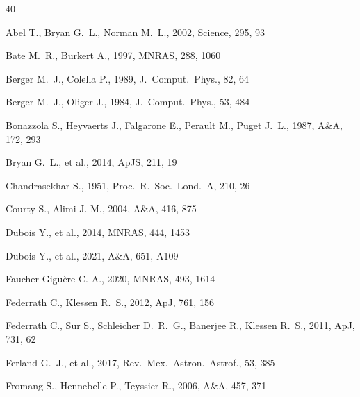 \documentclass[fleqn,usenatbib]{mnras}
\begin{document}

\begin{thebibliography}{40}

Abel T., Bryan G.~L., Norman M.~L., 2002, Science, 295, 93

Bate M.~R., Burkert A., 1997, MNRAS, 288, 1060

Berger M.~J., Colella P., 1989, J.~Comput.\ Phys., 82, 64

Berger M.~J., Oliger J., 1984, J.~Comput.\ Phys., 53, 484

Bonazzola S., Heyvaerts J., Falgarone E., Perault M., Puget J.~L., 1987,
A\&A, 172, 293

Bryan G.~L., et al., 2014, ApJS, 211, 19

Chandrasekhar S., 1951, Proc.\ R.\ Soc.\ Lond.\ A, 210, 26

Courty S., Alimi J.-M., 2004, A\&A, 416, 875

Dubois Y., et al., 2014, MNRAS, 444, 1453

Dubois Y., et al., 2021, A\&A, 651, A109

Faucher-Gigu\`ere C.-A., 2020, MNRAS, 493, 1614

Federrath C., Klessen R.~S., 2012, ApJ, 761, 156

Federrath C., Sur S., Schleicher D.~R.~G., Banerjee R., Klessen R.~S.,
2011, ApJ, 731, 62

Ferland G.~J., et al., 2017, Rev.\ Mex.\ Astron.\ Astrof., 53, 385

Fromang S., Hennebelle P., Teyssier R., 2006, A\&A, 457, 371


\end{thebibliography}
\end{document}
